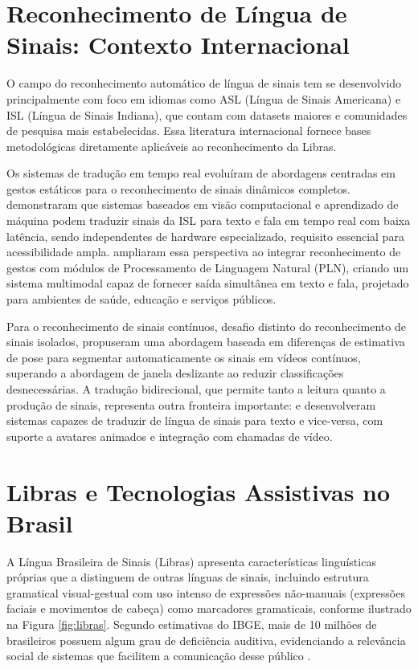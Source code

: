 \section{Reconhecimento de Língua de Sinais: Contexto Internacional}

O campo do reconhecimento automático de língua de sinais tem se desenvolvido principalmente com foco em idiomas como ASL (Língua de Sinais Americana) e ISL (Língua de Sinais Indiana), que contam com datasets maiores e comunidades de pesquisa mais estabelecidas. Essa literatura internacional fornece bases metodológicas diretamente aplicáveis ao reconhecimento da Libras.

Os sistemas de tradução em tempo real evoluíram de abordagens centradas em gestos estáticos para o reconhecimento de sinais dinâmicos completos.  demonstraram que sistemas baseados em visão computacional e aprendizado de máquina podem traduzir sinais da ISL para texto e fala em tempo real com baixa latência, sendo independentes de hardware especializado, requisito essencial para acessibilidade ampla.  ampliaram essa perspectiva ao integrar reconhecimento de gestos com módulos de Processamento de Linguagem Natural (PLN), criando um sistema multimodal capaz de fornecer saída simultânea em texto e fala, projetado para ambientes de saúde, educação e serviços públicos.

Para o reconhecimento de sinais contínuos, desafio distinto do reconhecimento de sinais isolados,  propuseram uma abordagem baseada em diferenças de estimativa de pose para segmentar automaticamente os sinais em vídeos contínuos, superando a abordagem de janela deslizante ao reduzir classificações desnecessárias. A tradução bidirecional, que permite tanto a leitura quanto a produção de sinais, representa outra fronteira importante:  e  desenvolveram sistemas capazes de traduzir de língua de sinais para texto e vice-versa, com suporte a avatares animados e integração com chamadas de vídeo.

\section{Libras e Tecnologias Assistivas no Brasil}

A Língua Brasileira de Sinais (Libras) apresenta características linguísticas próprias que a distinguem de outras línguas de sinais, incluindo estrutura gramatical visual-gestual com uso intenso de expressões não-manuais (expressões faciais e movimentos de cabeça) como marcadores gramaticais, conforme ilustrado na Figura \ref{fig:libras}. Segundo estimativas do IBGE, mais de 10 milhões de brasileiros possuem algum grau de deficiência auditiva, evidenciando a relevância social de sistemas que facilitem a comunicação desse público \cite{sousa:25}.

